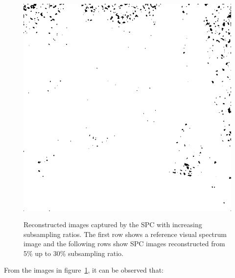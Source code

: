 \begin{figure}[H]
\begin{minipage}[t]{0.3\linewidth}
	\label{fig:hus_m30}
\end{minipage}
\begin{minipage}[t]{0.036\linewidth} %
~~~~~~
\end{minipage}
\begin{minipage}[t]{0.3\linewidth} %
	\includegraphics[width = 1\linewidth]{gfx/sit/sit_m30.png}
	\label{fig:sit_m30}
\end{minipage}
	\caption{Reconstructed images captured by the SPC with increasing subsampling ratios. The first row shows a reference visual spectrum image and the following rows show SPC images reconstructed from 5\% up to 30\% subsampling ratio.}
	\label{fig:subsampling_ratios}
\end{figure}

From the images in figure~\ref{fig:subsampling_ratios}, it can be observed that:

